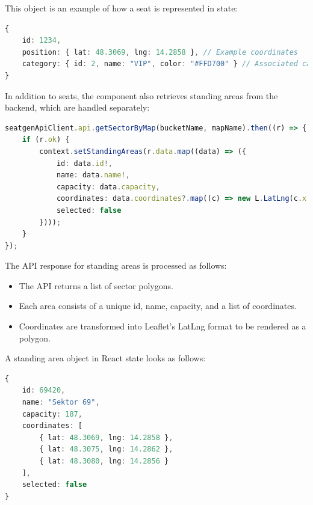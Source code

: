 This object is an example of how a seat is represented in state:

\begin{lstlisting}[language=TypeScript, caption=Seat Object in State, label=lst:seat-object]
{
    id: 1234,
    position: { lat: 48.3069, lng: 14.2858 }, // Example coordinates
    category: { id: 2, name: "VIP", color: "#FFD700" } // Associated category
}
\end{lstlisting}

In addition to seats, the component also retrieves standing areas from the backend, which are handled separately:

\begin{lstlisting}[language=TypeScript, caption=Fetching Standing Areas, label=lst:fetch-standingareas]
seatgenApiClient.api.getSectorByMap(bucketName, mapName).then((r) => {
    if (r.ok) {
        context.setStandingAreas(r.data.map((data) => ({
            id: data.id!,
            name: data.name!,
            capacity: data.capacity,
            coordinates: data.coordinates?.map((c) => new L.LatLng(c.x!, c.y!)) ?? [],
            selected: false
        })));
    }
});
\end{lstlisting}

The API response for standing areas is processed as follows:
\begin{itemize}
    \item The API returns a list of sector polygons.
    \item Each area consists of a unique id, name, capacity, and a list of coordinates.
    \item Coordinates are transformed into Leaflet’s LatLng format to be rendered as a polygon.
\end{itemize}

A standing area object in React state looks as follows:
\begin{lstlisting}[language=TypeScript, caption=Standing Area Object in State, label=lst:standingarea-object]
{
    id: 69420,
    name: "Sektor 69",
    capacity: 187,
    coordinates: [
        { lat: 48.3069, lng: 14.2858 },
        { lat: 48.3075, lng: 14.2862 },
        { lat: 48.3080, lng: 14.2856 }
    ],
    selected: false
}
\end{lstlisting}

